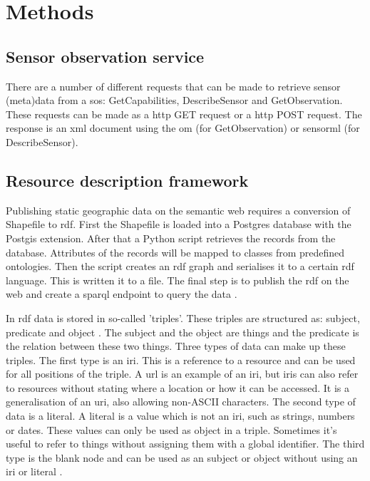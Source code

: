 \section{Methods}
\label{chap:methods}


\subsection{Sensor observation service}
There are a number of different requests that can be made to retrieve sensor (meta)data from a \ac{sos}: GetCapabilities, DescribeSensor and GetObservation. These requests can be made as a \ac{http} GET request or a \ac{http} POST request. The response is an \ac{xml} document using the \ac{om} (for GetObservation) or \ac{sensorml} (for DescribeSensor).

\subsection{Resource description framework}
Publishing static geographic data on the semantic web requires a conversion of Shapefile to \ac{rdf}. First the Shapefile is loaded into a Postgres database with the Postgis extension. After that a Python script retrieves the records from the database. Attributes of the records will be mapped to classes from predefined ontologies. Then the script creates an \ac{rdf} graph and serialises it to a certain \ac{rdf} language. This is written it to a file. The final step is to publish the \ac{rdf} on the web and create a \ac{sparql} endpoint to query the data \citep{LD:Missier}. 

In \ac{rdf} data is stored in so-called 'triples'. These triples are structured as: subject, predicate and object \cite{LD:Berners-lee}. The subject and the object are things and the predicate is the relation between these two things. Three types of data can make up these triples. The first type is an \ac{iri}. This is a reference to a resource and can be used for all positions of the triple. A \ac{url} is an example of an \ac{iri}, but \ac{iri}s can also refer to resources without stating where a location or how it can be accessed. It is a generalisation of an \ac{uri}, also allowing non-ASCII characters. The second type of data is a literal. A literal is a value which is not an \ac{iri}, such as strings, numbers or dates. These values can only be used as object in a triple. Sometimes it's useful to refer to things without assigning them with a global identifier. The third type is the blank node and can be used as an subject or object without using an \ac{iri} or literal \citep{LD:W3C6}. 

